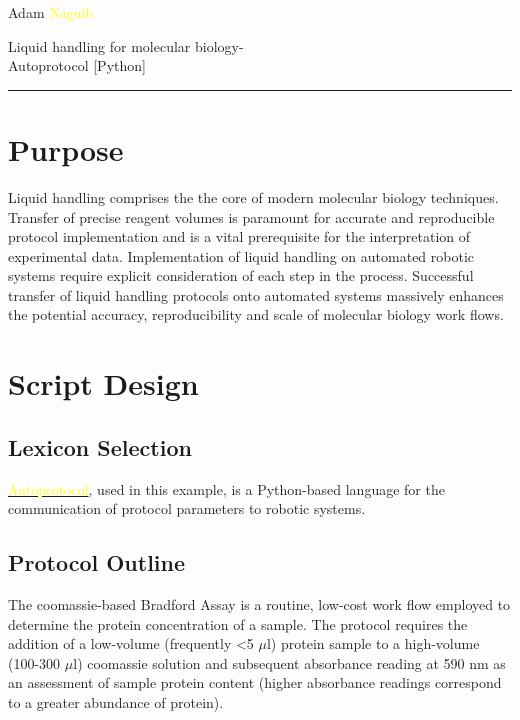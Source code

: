 \documentclass{article}
\begin{document}
\begin{minipage}[t]{9cm}
\vspace{5 mm}
\hspace{-4mm} \noindent \textcolor{black!50}{Adam} \textcolor{yellow}{Naguib}
\end{minipage}

\begin{minipage}[t]{18.5 cm}
\begin{flushright}
\vspace{-8mm}
\huge \textcolor{black!40}{Liquid handling for molecular biology-\\ Autoprotocol [Python]}\\
\end{flushright}
\end{minipage}

\vspace{2 mm}
\hspace{-6mm} \textcolor{black!50}{\rule{\linewidth}{2.5pt}}
\vspace{2 mm}

\section{Purpose}
Liquid handling comprises the the core of modern molecular biology techniques.  Transfer of precise reagent volumes is paramount for accurate and reproducible protocol implementation and is a vital prerequisite for the interpretation of experimental data.  Implementation of liquid handling on automated robotic systems require explicit consideration of each step in the process.  Successful transfer of liquid handling protocols onto automated systems massively enhances the potential accuracy, reproducibility and scale of molecular biology work flows. 

\section{Script Design}
\subsection{Lexicon Selection}
 \href{http://autoprotocol-python.readthedocs.org/en/latest/#}{\textcolor{yellow}{Autoprotocol}}, used in this example, is a Python-based language for the communication of protocol parameters to robotic systems. 

\subsection{Protocol Outline}
The coomassie-based Bradford Assay is a routine, low-cost work flow employed to determine the protein concentration of a sample.  The protocol requires the addition of a low-volume (frequently <5 $\mu$l) protein sample to a high-volume (100-300 $\mu$l) coomassie solution and subsequent absorbance reading at 590 nm as an assessment of sample protein content (higher absorbance readings correspond to a greater abundance of protein).
\end{document}
